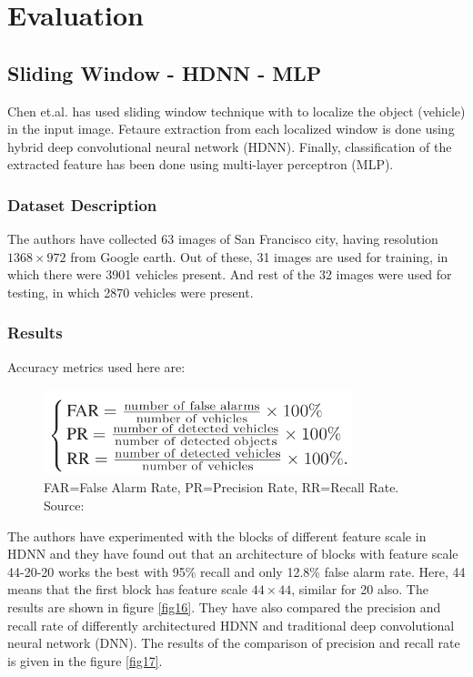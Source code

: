 \chapter{Evaluation}
\label{ch5}


\section{Sliding Window - HDNN - MLP}
Chen et.al. \cite{b8} has used sliding window technique with to localize the object (vehicle) in the input image. Fetaure extraction from each localized window is done using hybrid deep convolutional neural network (HDNN). Finally, classification of the extracted feature has been done using multi-layer perceptron (MLP). 

\subsection{Dataset Description}
The authors have collected 63 images of San Francisco city, having resolution $1368\times 972$ from Google earth. Out of these, 31 images are used for training, in which there were 3901 vehicles present. And rest of the 32 images were used for testing, in which 2870 vehicles were present. 
\subsection{Results}
Accuracy metrics used here are: 

\begin{figure}[!htbp]
\centerline{\includegraphics[height=25mm,width=90mm]{img/fig15.png}}
\caption{FAR=False Alarm Rate, PR=Precision Rate, RR=Recall Rate. Source: \cite{b8}}
\label{fig15}
\end{figure}

The authors have experimented with the blocks of different feature scale in HDNN and they have found out that an architecture of blocks with feature scale 44-20-20 works the best with 95\% recall and only 12.8\% false alarm rate. Here, 44 means that the first block has feature scale $44\times 44$, similar for 20 also. The results are shown in figure \ref{fig16}. They have also compared the precision and recall rate of differently architectured HDNN and traditional deep convolutional neural network (DNN). The results of the comparison of precision and recall rate is given in the figure \ref{fig17}.  

